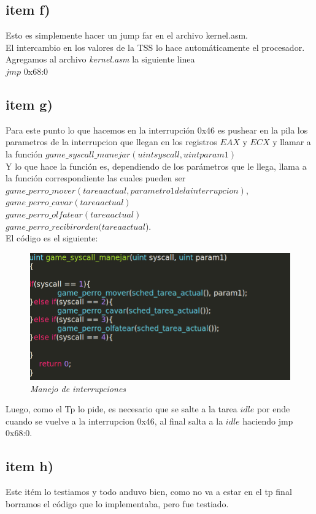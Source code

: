 \subsection{item f)}
Esto es simplemente hacer un jump far en el archivo kernel.asm.\\
El intercambio en los valores de la TSS lo hace automáticamente el procesador. Agregamos al archivo \textit{kernel.asm} la siguiente linea\\
 $jmp$ 0x68:0

 \subsection{item g)}
Para este punto lo que hacemos en la interrupción 0x46 es pushear en la pila los parametros de la interrupcion que llegan en los registros $EAX$ y $ECX$ y llamar a la función $game\_syscall\_manejar(uint syscall, uint param1)$ \\
Y lo que hace la función es, dependiendo de los parámetros que le llega, llama a la función correspondiente las cuales pueden ser\\
$game\_perro\_mover(tarea actual, parametro 1 de la interrupcion)$,\\
$game\_perro\_cavar(tarea actual)$ \\
$game\_perro\_olfatear(tarea actual)$\\
$game\_perro\_recibirorden(tarea actual$).\\
El código es el siguiente:\\

\begin{figure}[H]
\begin{center}
\includegraphics[width=\linewidth]{ejercicio6/syscall_manejar.png}
\caption{{\small \textit{Manejo de interrupciones}}}
\endminipage
\end{center}
\end{figure}

Luego, como el Tp lo pide, es necesario que se salte a la tarea $idle$ por ende cuando se vuelve a la interrupcion 0x46, al final salta a la $idle$ haciendo jmp 0x68:0.

\subsection{item h)}

Este itém lo testiamos y todo anduvo bien, como no va a estar en el tp final borramos el código que lo implementaba, pero fue testiado.

